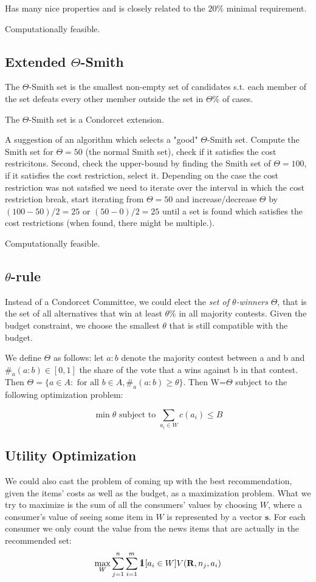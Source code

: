 \documentclass{article}
\def\one{\mbox{1\hspace{-4.25pt}\fontsize{12}{14.4}\selectfont\textrm{1}}} %
\begin{document}
Has many nice properties and is closely related to the $20\%$ minimal requirement.

Computationally feasible.


\subsection{Extended $\Theta$-Smith}

The $\Theta$-Smith set is the smallest non-empty set of candidates s.t. each member of the set defeats every other member outside
 the set in $\Theta \%$ of cases.

 The $\Theta$-Smith set is a Condorcet extension.

A suggestion of an algorithm which selects a "good" $\Theta$-Smith set. Compute the Smith set for $\Theta=50$
(the normal Smith set), check if it satisfies the cost restricitons. Second, check the upper-bound by finding the Smith
set of $\Theta=100$, if it satisfies the cost restriction, select it. Depending on the case the cost restriction was not
satsfied we need to iterate over the interval in which the cost restriction break, start iterating from $\Theta=50$ and
 increase/decrease $\Theta$ by $(100-50)/2=25$ or $(50-0)/2=25$ until a set is found which satisfies the cost
 restrictions (when found, there might be multiple.).

Computationally feasible.

\subsection{$\theta$-rule}

Instead of a Condorcet Committee, we could elect the \emph {set of $\theta$-winners} $\Theta$, that is the set
of all alternatives that win at least $\theta \% $ in all majority contests. Given the budget constraint, we
choose the smallest $\theta$ that is still compatible with the budget.

We define $\Theta$ as follows: let $a:b$ denote the majority contest between a and b and $\#_a(a:b)\in [0,1]$ the
share of the vote that a wins against b in that contest. Then $\Theta=\{a\in A: \text { for all } b\in A, \#_a(a:b)\geq \theta\}$. Then W=$\Theta$ subject to the following optimization problem:

\[\min \theta \text{ subject to } \sum_{a_i\in W}c(a_i)\leq B\]

\subsection{Utility Optimization}
We could also cast the problem of coming up with the best recommendation, 
given the items' costs as well as the budget, as a maximization problem. 
What we try to maximize is the sum of all the consumers' values by choosing $W$, 
where a consumer's value of seeing some item in $W$ is represented by a vector $\mathbf{s}$. 
For each consumer we only count the value from the news items that are actually in the recommended set:\\
\[
\max_W \sum_{j=1}^n \sum_{i=1}^m \one [a_i\in W] V(\mathbf{R}, n_j, a_i)
\]
\end{document}
